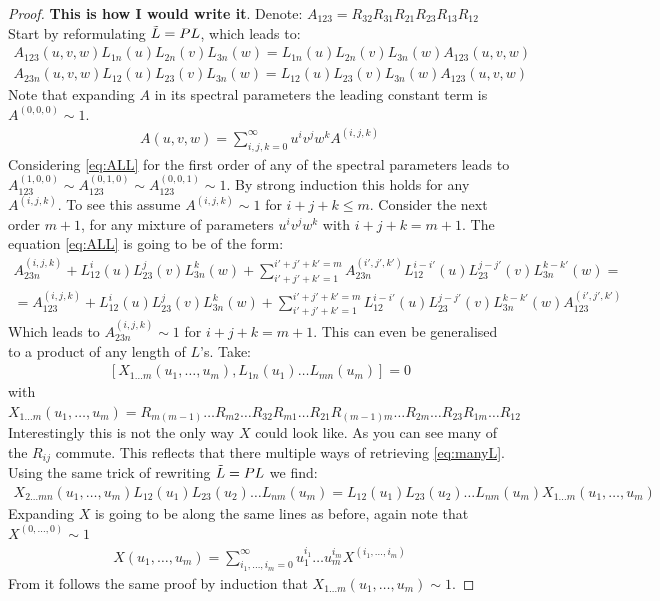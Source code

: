 \documentclass{article}
\begin{document}
\begin{proof}
\iffalse

\textbf{This is how I would write it}. 
Denote: $A_{123}=R_{32}R_{31}R_{21}R_{23}R_{13}R_{12}$
Start by reformulating $\Tilde{L}=PL$, which leads to:
\begin{align}
\label{eq:ALL}
A_{123}(u,v,w)L_{1n}(u)L_{2n}(v)L_{3n}(w)=L_{1n}(u)L_{2n}(v)L_{3n}(w)A_{123}(u,v,w)\\
A_{23n}(u,v,w)L_{12}(u)L_{23}(v)L_{3n}(w)=L_{12}(u)L_{23}(v)L_{3n}(w)A_{123}(u,v,w)
\end{align}
%
Note that expanding $A$ in its spectral parameters the leading constant term is $A^{(0,0,0)} \sim 1$.
%
\begin{align}
A(u,v,w) =  \sum_{i,j,k=0}^\infty u^i v^j w^k A^{(i,j,k)}
\end{align}
%
Considering \ref{eq:ALL} for the first order of any of the spectral parameters leads to $ A^{(1,0,0)}_{123}\sim  A^{(0,1,0)}_{123} \sim  A^{(0,0,1)}_{123}  \sim1$. By strong induction this holds for any $A^{(i,j,k)}$. To see this assume  $A^{(i,j,k)}\sim 1$  for $i+j+k\leq m$. Consider the next order $m+1$, for any mixture of parameters $u^i v^j w^k$ with $i+j+k=m+1$. The equation \ref{eq:ALL} is going to be of the form:
\begin{align}
A^{(i,j,k)}_{23n} +L^{i}_{12}(u)L^{j}_{23}(v)L^{k}_{3n}(w) +\sum^{i'+j'+k'=m}_{i'+j'+k'=1} A^{(i',j',k')}_{23n} L^{i-i'}_{12}(u)L^{j-j'}_{23}(v)L^{k-k'}_{3n}(w) =\\
=A^{(i,j,k)}_{123} +L^{i}_{12}(u)L^{j}_{23}(v)L^{k}_{3n}(w)+ \sum^{i'+j'+k'=m}_{i'+j'+k'=1} L^{i-i'}_{12}(u)L^{j-j'}_{23}(v)L^{k-k'}_{3n}(w) A^{(i',j',k')}_{123} 
\end{align}
Which leads to $A^{(i,j,k)}_{23n} \sim 1$ for $i+j+k= m+1$.
This can even be generalised to a product of any length of $L$'s. Take:
\begin{align}\label{eq:manyL}
[X_{1 \ldots m} (u_1,\ldots, u_m) , L_{1n}(u_1)\ldots L_{mn}(u_m)]=0
\end{align}
with $X_{1 \ldots m} (u_1,\ldots, u_m)= R_{m (m-1)}\dots R_{m2}\dots R_{32} R_{m1}\dots  R_{21}   R_{(m-1) m} \dots R_{2m}\dots R_{23}R_{1m}\dots R_{12}$\\
Interestingly this is not the only way $X$ could look like. As you can see many of the $R_{ij}$ commute. This reflects that there multiple ways of retrieving \ref{eq:manyL}.
Using the same trick of rewriting $\Tilde{L}=PL$ we find:
\begin{align}
\label{eq:ALL}
X_{2\dots m n}(u_1,\dots,u_m)L_{12}(u_1)L_{23}(u_2)\dots L_{nm}(u_m)=L_{12}(u_1)L_{23}(u_2)\dots L_{nm}(u_m)X_{1\dots m}(u_1,\dots,u_m)
\end{align}
Expanding $X$ is going to be along the same lines as before, again note that $X^{(0,\dots,0)}\sim 1$
\begin{align}
X(u_1,\dots, u_m) =  \sum_{i_1,\dots, i_m=0}^\infty u_1^{i_1}\dots u_m^{i_m} X^{(i_1, \dots, i_m)}
\end{align}
From it follows the same proof by induction that $X_{1\dots m}(u_1,\dots,u_m)
\sim 1$.

\end{proof}
\end{document}
